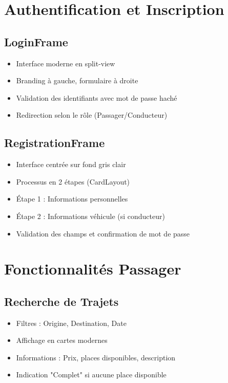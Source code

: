 \documentclass[12pt,a4paper]{report}
\begin{document}
\section{Authentification et Inscription}

\subsection{LoginFrame}
\begin{itemize}
    \item Interface moderne en split-view
    \item Branding à gauche, formulaire à droite
    \item Validation des identifiants avec mot de passe haché
    \item Redirection selon le rôle (Passager/Conducteur)
\end{itemize}

\subsection{RegistrationFrame}
\begin{itemize}
    \item Interface centrée sur fond gris clair
    \item Processus en 2 étapes (CardLayout)
    \item Étape 1 : Informations personnelles
    \item Étape 2 : Informations véhicule (si conducteur)
    \item Validation des champs et confirmation de mot de passe
\end{itemize}

\section{Fonctionnalités Passager}

\subsection{Recherche de Trajets}
\begin{itemize}
    \item Filtres : Origine, Destination, Date
    \item Affichage en cartes modernes
    \item Informations : Prix, places disponibles, description
    \item Indication "Complet" si aucune place disponible
\end{itemize}
\end{document}
